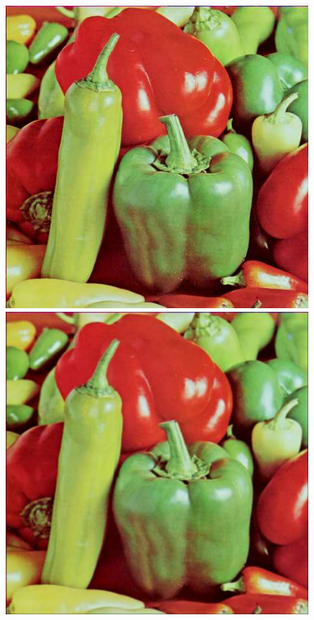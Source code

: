\documentclass{article}
\begin{document}
\begin{figure}[!htb]
\centering
\includegraphics[scale=0.2]{img/peppers_24bit.png}
\includegraphics[scale=0.2]{img/_Filtr_Dolnoprzepustowy_peppers_24bit.png}\\ 

\end{figure}
\end{document}
